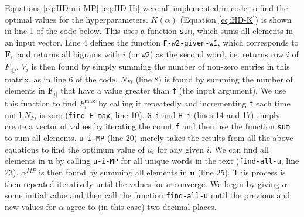 Equations \ref{eq:HD-u-i-MP}-\ref{eq:HD-Hi} were all implemented in code to find the optimal values for the hyperparameters. $K(\alpha)$ (Equation \ref{eq:HD-K}) is shown in line 1 of the code below. This uses a function \lstinline!sum!, which sums all elements in an input vector. Line 4 defines the function \lstinline!F-w2-given-w1!, which corresponds to $\boldsymbol{F}_{i|}$ and returns all bigrams with $i$ (or \lstinline!w2!) as the second word, i.e. returns row $i$ of $F_{i|j}$. $V_{i}$ is then found by simply summing the number of non-zero entries in this matrix, as in line 6 of the code. $N_{Fi}$ (line 8) is found by summing the number of elements in $\boldsymbol{F}_{i|}$ that have a value greater than \lstinline!f! (the input argument). We use this function to find $F_{i}^{\text{max}}$ by calling it repeatedly and incrementing \lstinline!f! each time until $N_{Fi}$ is zero (\lstinline!find-F-max!, line 10). \lstinline!G-i! and \lstinline!H-i! (lines 14 and 17) simply create a vector of values by iterating the count \lstinline!f! and then use the function \lstinline!sum! to sum all elements. \lstinline!u-i-MP! (line 20) merely takes the results from all the above equations to find the optimum value of $u_{i}$ for any  given $i$. We can find all elements in $\boldsymbol{u}$ by calling \lstinline!u-i-MP! for all unique words in the text (\lstinline!find-all-u!, line 23). $\alpha^{MP}$ is then found by summing all elements in $\boldsymbol{u}$ (line 25). This process is then repeated iteratively until the values for $\alpha$ converge. We begin by giving $\alpha$ some initial value and then call the function \lstinline!find-all-u! until the previous and new values for $\alpha$ agree to (in this case) two decimal places.

